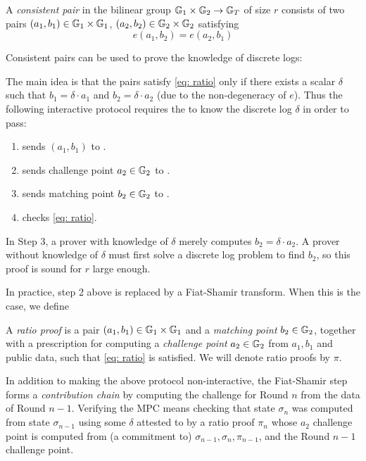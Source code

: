 \begin{definition}
    A \emph{consistent pair} in the bilinear group $\mathbb{G}_1 \times \mathbb{G}_2 \to \mathbb{G}_T$ of size $r$ consists of two pairs $(a_1, b_1) \in \mathbb{G}_1 \times \mathbb{G}_1 $, $(a_2, b_2) \in \mathbb{G}_2 \times \mathbb{G}_2$ satisfying 
    \begin{equation}\label{eq: ratio}
        e\left( a_1, b_2 \right) = e\left( a_2, b_1\right)
    \end{equation}
\end{definition}
Consistent pairs can be used to prove the knowledge of discrete logs:

The main idea is that the pairs satisfy \eqref{eq: ratio} only if there exists a scalar $\delta$ such that $b_1 = \delta \cdot a_1$ and $b_2 = \delta \cdot a_2$ (due to the non-degeneracy of $e$). Thus the following interactive protocol requires the \Prover{} to know the discrete log $\delta$ in order to pass:
\begin{enumerate}
    \item \Prover{} sends $(a_1, b_1)$ to \Verifier{}.
    \item \Verifier{} sends challenge point $a_2 \in \mathbb{G}_2$ to \Prover{}.
    \item \Prover{} sends matching point $b_2 \in \mathbb{G}_2$ to \Verifier{}.
    \item \Verifier{} checks \eqref{eq: ratio}.
\end{enumerate}
In Step 3, a prover with knowledge of $\delta$ merely computes $b_2 = \delta \cdot a_2$. A prover without knowledge of $\delta$ must first solve a discrete log problem to find $b_2$, so this proof is sound for $r$ large enough.

In practice, step 2 above is replaced by a Fiat-Shamir transform. %
When this is the case, we define
\begin{definition}
    A \emph{ratio proof} is a pair $(a_1, b_1) \in \mathbb{G}_1 \times \mathbb{G}_1$ and a \emph{matching point} $b_2 \in \mathbb{G}_2$, together with a prescription for computing a \emph{challenge point} $a_2 \in \mathbb{G}_2$ from $a_1, b_1$ and public data, such that \eqref{eq: ratio} is satisfied. We will denote ratio proofs by $\pi$.
\end{definition}

In addition to making the above protocol non-interactive, the Fiat-Shamir step forms a \emph{contribution chain} by computing the challenge for Round $n$ from the data of Round $n-1$. Verifying the MPC means checking that state $\sigma_n$ was computed from state $\sigma_{n-1}$ using some $\delta$ attested to by a ratio proof $\pi_n$ whose $a_2$ challenge point is computed from (a commitment to) $\sigma_{n-1}, \sigma_n, \pi_{n-1}$, and the Round $n-1$ challenge point. %

